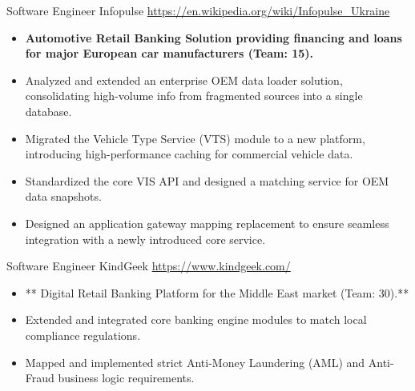\documentclass[a4paper, serif, 11pt]{moderncv}
\begin{document}
        {Software Engineer}
        {Infopulse}
        {\url{https://en.wikipedia.org/wiki/Infopulse\_Ukraine}}
        {}
        {\begin{itemize}
\item \textbf{Automotive Retail Banking Solution providing financing and loans for major European car manufacturers (Team: 15).}
\item Analyzed and extended an enterprise OEM data loader solution, consolidating high-volume info from fragmented sources into a single database.
\item Migrated the Vehicle Type Service (VTS) module to a new platform, introducing high-performance caching for commercial vehicle data.
\item Standardized the core VIS API and designed a matching service for OEM data snapshots.
\item Designed an application gateway mapping replacement to ensure seamless integration with a newly introduced core service.
\end{itemize}}

        {Software Engineer}
        {KindGeek}
        {\url{https://www.kindgeek.com/}}
        {}
        {\begin{itemize}
\item ** Digital Retail Banking Platform for the Middle East market (Team: 30).**
\item Extended and integrated core banking engine modules to match local compliance regulations.
\item Mapped and implemented strict Anti-Money Laundering (AML) and Anti-Fraud business logic requirements.
\end{itemize}}
\end{document}
